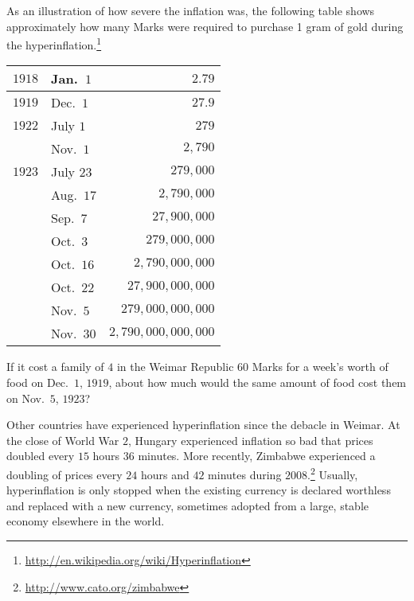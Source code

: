 \documentclass{ximera}
\begin{document}
As an illustration of how severe the inflation was, the following table shows approximately how many Marks were required to purchase 1 gram of gold during the hyperinflation.\footnote{\href{http://en.wikipedia.org/wiki/Hyperinflation}{http://en.wikipedia.org/wiki/Hyperinflation}}

\begin{center}
\begin{tabular}{@{}llr@{}}\toprule
\textbf{$1918$} & Jan.\ $1$ & $2.79$ \\\midrule
\textbf{$1919$} & Dec.\ $1$ & $27.9$\\\midrule
\textbf{$1922$} & July $1$ & $279$\\
 & Nov.\ $1$ & $2,790$\\\midrule
 \textbf{$1923$} & July $23$ & $279,000$\\
 & Aug.\ $17$ & $2,790,000$\\
 &  Sep.\ $7$ & $27,900,000$\\
 & Oct.\ $3$ & $279,000,000$\\
 & Oct.\ $16$ & $2,790,000,000$\\
 &  Oct.\ $22$ & $27,900,000,000$\\
 & Nov.\ $5$ & $279,000,000,000$\\
 & Nov.\ $30$ & $2,790,000,000,000$\\\bottomrule
\end{tabular}
\end{center}

\begin{question}
If it cost a family of $4$ in the Weimar Republic $60$ Marks for a week's worth of food on Dec.\ $1$, $1919$, about how much would the same amount of food cost them on Nov.\ $5$, $1923$?

\begin{multipleChoice}
\end{multipleChoice}
	
\end{question}

Other countries have experienced hyperinflation since the debacle in Weimar. At the close of World War $2$, Hungary experienced inflation so bad that prices doubled every $15$ hours $36$ minutes. More recently, Zimbabwe experienced a doubling of prices every $24$ hours and $42$ minutes during $2008$.\footnote{\href{http://www.cato.org/zimbabwe}{http://www.cato.org/zimbabwe}} Usually, hyperinflation is only stopped when the existing currency is declared worthless and replaced with a new currency, sometimes adopted from a large, stable economy elsewhere in the world.
\end{document}
